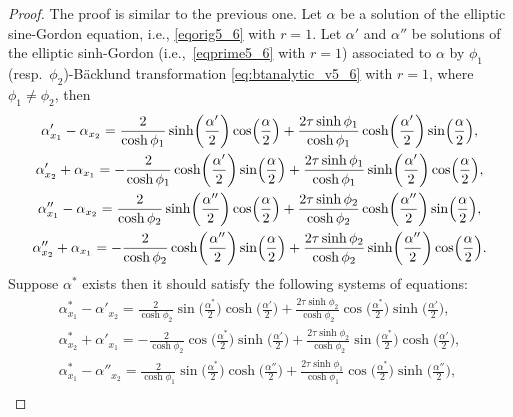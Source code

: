 \documentclass[pdftex]{sigma}
\numberwithin{equation}{section}
\begin{document}
\begin{proof} The proof is similar to the previous one.
Let $\alpha$ be a solution of the elliptic sine-Gordon equation, i.e., \eqref{eqorig5_6} with $r=1$.
Let $\alpha'$ and $\alpha''$ be solutions of the
elliptic sinh-Gordon (i.e.,~\eqref{eqprime5_6} with $r=1$)
associated to $\alpha$ by $\phi_1$(resp.\ $\phi_2$)-B\"acklund transformation
\eqref{eq:btanalytic_v5_6} with $r=1$, where $\phi_1\neq \phi_2$, then
\begin{gather}
\alpha'_{x_1}-\alpha_{x_2}=\frac{2}{\cosh\phi_1}\sinh \biggl(\frac{\alpha'}{2}\biggr)\cos \Bigl(\frac{\alpha}{2}\Bigr)+\frac{2\tau\sinh\phi_1}{\cosh\phi_1} \cosh\biggl(\frac{\alpha'}{2}\biggr)\sin \Bigl(\frac{\alpha}{2}\Bigr),\nonumber\\
\alpha'_{x_2}+\alpha_{x_1}=-\frac{2}{\cosh\phi_1}\cosh\biggl(\frac{\alpha'}{2}\biggr)\sin\Bigl(\frac{\alpha}{2}\Bigr)
+\frac{2\tau\sinh\phi_1}{\cosh\phi_1} \sinh\biggl(\frac{\alpha'}{2}\biggr)\cos\Bigl(\frac{\alpha}{2}\Bigr),\label{BTcase61_th3}\\
\alpha''_{x_1}-\alpha_{x_2}=\frac{2}{\cosh\phi_2}\sinh\biggl(\frac{\alpha''}{2}\biggr)\cos \Bigl(\frac{\alpha}{2}\Bigr)
+\frac{2\tau\sinh\phi_2}{\cosh\phi_2} \cosh\biggl(\frac{\alpha''}{2}\biggr)\sin\Bigl(\frac{\alpha}{2}\Bigr),\nonumber\\
\alpha''_{x_2}+\alpha_{x_1}=-\frac{2}{\cosh\phi_2}\cosh\biggl(\frac{\alpha''}{2}\biggr)\sin\Bigl(\frac{\alpha}{2}\Bigr)
+\frac{2\tau\sinh\phi_2}{\cosh\phi_2} \sinh\biggl(\frac{\alpha''}{2}\biggr)\cos\Bigl(\frac{\alpha}{2}\Bigr).\label{BTcase62_th3}
\end{gather}
Suppose $\alpha^*$ exists then it should satisfy the following
systems of equations:
\begin{gather}
\alpha^*_{x_1}-\alpha'_{x_2}=\frac{2}{\cosh\phi_2}\sin\biggl(\frac{\alpha^*}{2}\biggr)\cosh\biggl(\frac{\alpha'}{2}\biggr)+\frac{2\tau\sinh\phi_2}{\cosh\phi_2} \cos\biggl(\frac{\alpha^*}{2}\biggr)\sinh\biggl(\frac{\alpha'}{2}\biggr),\nonumber\\
\alpha^*_{x_2}+\alpha'_{x_1}=-\frac{2}{\cosh\phi_ 2}\cos\biggl(\frac{\alpha^*}{2}\biggr)\sinh\biggl(\frac{\alpha'}{2}\biggr)+\frac{2\tau\sinh\phi_2}{\cosh\phi_2} \sin\biggl(\frac{\alpha^*}{2}\biggr)\cosh\biggl(\frac{\alpha'}{2}\biggr),\label{BTcase52_th3}\\
\alpha^*_{x_1}-\alpha''_{x_2}=\frac{2}{\cosh\phi_1}\sin\biggl(\frac{\alpha^*}{2}\biggr)\cosh\biggl(\frac{\alpha''}{2}\biggr)+\frac{2\tau\sinh\phi_1}{\cosh\phi_1} \cos\biggl(\frac{\alpha^*}{2}\biggr)\sinh\biggl(\frac{\alpha''}{2}\biggr),\nonumber\\

\end{gather}
\end{proof}
\end{document}
